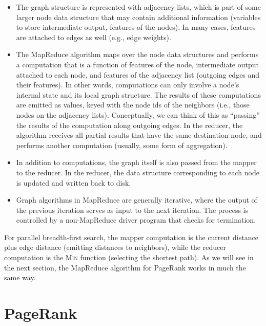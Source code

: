 \begin{itemize}

\item The graph structure is represented with adjacency lists, which is
  part of some larger node data structure that may contain additional
  information (variables to store intermediate output, features of the
  nodes).  In many cases, features are attached to edges as well
  (e.g., edge weights).

\item The MapReduce algorithm maps over the node data structures and
  performs a computation that is a function of features of the node,
  intermediate output attached to each node, and features of the
  adjacency list (outgoing edges and their features).  In other words,
  computations can only involve a node's internal state and its local
  graph structure.  The results of these computations are emitted as
  values, keyed with the node ids of the neighbors (i.e., those nodes
  on the adjacency lists).  Conceptually, we can think of this as
  ``passing'' the results of the computation along outgoing edges.  In
  the reducer, the algorithm receives all partial results that have
  the same destination node, and performs another computation
  (usually, some form of aggregation).

\item In addition to computations, the graph itself is also passed
  from the mapper to the reducer.  In the reducer, the data structure
  corresponding to each node is updated and written back to disk.

\item Graph algorithms in MapReduce are generally iterative, where the
  output of the previous iteration serves as input to the next
  iteration.  The process is controlled by a non-MapReduce driver
  program that checks for termination.

\end{itemize}

\noindent For parallel breadth-first search, the mapper computation is
the current distance plus edge distance (emitting distances to
neighbors), while the reducer computation is the \textsc{Min} function
(selecting the shortest path).  As we will see in the next section,
the MapReduce algorithm for PageRank works in much the same way.

\section{PageRank}
\label{chapter-graphs:PageRank}

